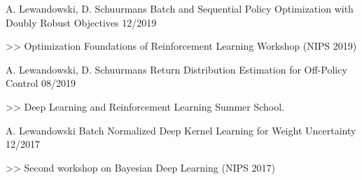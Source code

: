 \begin{cventries}
    \cventry
    {A. Lewandowski, D. Schuurmans}
    {Batch and Sequential Policy Optimization with Doubly Robust Objectives}
    {12/2019}
    {
      \begin{cvitems}
    	\item[>>] Optimization Foundations of Reinforcement Learning Workshop (NIPS 2019)
      \end{cvitems}
    }

    \cventry
    {A. Lewandowski, D. Schuurmans}
    {Return Distribution Estimation for Off-Policy Control}
    {08/2019}
    {
      \begin{cvitems}
    	\item[>>] Deep Learning and Reinforcement Learning Summer School.
      \end{cvitems}
    }

  \cventry
    {A. Lewandowski}
    {Batch Normalized Deep Kernel Learning for Weight
Uncertainty}
    {12/2017}
    {
      \begin{cvitems}
    	\item[>>] Second workshop on Bayesian Deep Learning (NIPS 2017)
      \end{cvitems}
    }
  \end{cventries}

% 
% 
